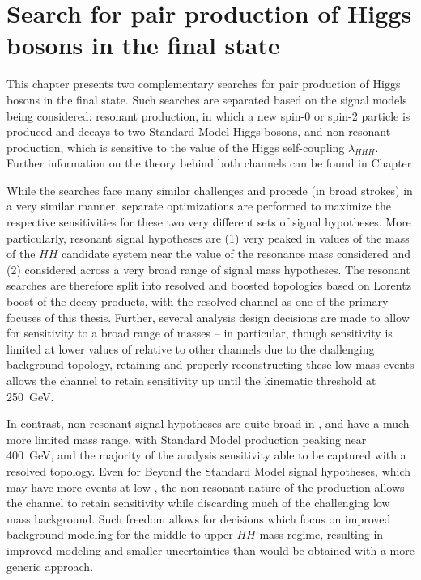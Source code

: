 \chapter{Search for pair production of Higgs bosons in the \bbbb final state}

This chapter presents two complementary searches for pair production of 
Higgs bosons in the final state. Such searches are separated based on the 
signal models being considered: resonant production, in which a new spin-0 or 
spin-2 particle is produced and decays to two Standard Model Higgs bosons, and 
non-resonant production, which is sensitive to the value of the Higgs self-coupling
$\lambda_{HHH}$. Further information on the theory behind both channels can be 
found in Chapter 

While the searches face many similar challenges and procede (in broad strokes) in a very 
similar manner, separate optimizations are performed to maximize the respective sensitivities 
for these two very different sets of signal hypotheses. More particularly, resonant signal 
hypotheses are (1) very peaked in values of the mass of the $HH$ candidate system near the 
value of the resonance mass considered and (2) considered across a very broad range of 
signal mass hypotheses. The resonant searches are therefore split into resolved and boosted 
topologies based on Lorentz boost of the decay products, with the resolved channel as one of the 
primary focuses of this thesis. Further, several analysis design decisions are made to 
allow for sensitivity to a broad range of masses -- in particular, though sensitivity is 
limited at lower values of \mhh relative to other channels  due to 
the challenging background topology, retaining and properly reconstructing these low mass events 
allows the \bbbb channel to retain sensitivity up until the kinematic threshold at \SI{250}{\GeV}.

In contrast, non-resonant signal hypotheses are quite broad in \mhh, and have a much more limited 
mass range, with Standard Model production peaking near \SI{400}{GeV}, and the majority of the analysis 
sensitivity able to be captured with a resolved topology. Even for Beyond the Standard 
Model signal hypotheses, which may have more events at low \mhh, the non-resonant nature of the
production allows the \bbbb channel to retain sensitivity while discarding much of the challenging 
low mass background. Such freedom allows for decisions which focus on improved background modeling 
for the middle to upper $HH$ mass regime, resulting in improved modeling and smaller uncertainties 
than would be obtained with a more generic approach.

